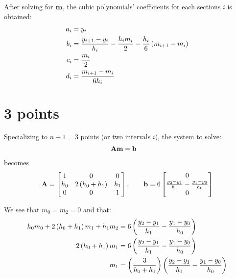 \documentclass[12pt,letterpaper]{article}
\begin{document}
After solving for $\textbf{m}$, the cubic polynomials' coefficients for each sections $i$ is obtained:
\begin{subequations}
\begin{align}
a_i & = y_i \\
b_i & = \frac{y_{i+1}-y_{i}}{h_{i}} - \frac{h_{i} m_{i}}{2} - \frac{h_{i}}{6} \left( m_{i+1} - m_{i} \right) \\
c_i & = \frac{m_{i}}{2} \\
d_i & = \frac{m_{i+1} - m_{i}}{6 h_{i}}
\end{align}
\end{subequations}


\section{3 points}
Specializing to $n+1=3$ points (or two intervals $i$), the system to solve:
\begin{align}
\textbf{A} \textbf{m} & = \textbf{b}
\end{align}
becomes
\begin{align}
\textbf{A} =
\begin{bmatrix}
1       & 0                 & 0     \\
h_{0}   & 2\left( h_{0}+h_{1} \right) & h_{1} \\
0       & 0                 & 1
\end{bmatrix}, \hspace{20pt}
\textbf{b} = 6
\begin{bmatrix}
0 \\
\frac{y_{2}-y_{1}}{h_{1}} - \frac{y_{1}-y_{0}}{h_{0}}  \\
0
\end{bmatrix}
\end{align}

We see that $m_{0} = m_{2} = 0$ and that:
\begin{align}
h_{0} m_{0} + 2\left( h_{0} + h_{1} \right) m_{1} + h_{1} m_{2} & = 6 \left( \frac{y_{2}-y_{1}}{h_{1}} - \frac{y_{1}-y_{0}}{h_{0}} \right) \\
2\left( h_{0} + h_{1} \right) m_{1} & = 6 \left( \frac{y_{2}-y_{1}}{h_{1}} - \frac{y_{1}-y_{0}}{h_{0}} \right) \\
m_{1} & = \left(  \frac{3}{h_{0} + h_{1}}  \right) \left( \frac{y_{2}-y_{1}}{h_{1}} - \frac{y_{1}-y_{0}}{h_{0}} \right)
\end{align}
\end{document}

